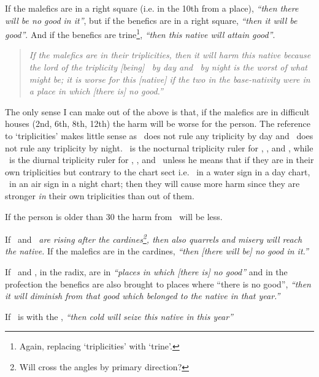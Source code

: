 If  the malefics are in a right square (i.e. in the 10th from a place), \textsl{``then there will be no good in it''}, but if the benefics are in a right square, \textsl{``then it will be good''}. And if the benefics are trine\footnote{Again, replacing `triplicities' with `trine'.}, \textsl{``then this native will attain good''}.

\begin{quote}
\textsl{If the malefics are in their triplicities, then it will harm this native because the lord of the triplicity [being] \Mars\, by day and \Saturn\, by night is the worst of what might be; it is worse for this [native] if the two in the base-nativity were in a place in which [there is] no good.''}
\end{quote}

\begin{mdframed}[backgroundcolor=cyan!5, rightmargin=1em, leftmargin=1em]
The only sense I can make out of the above is that, if the malefics are in difficult houses (2nd, 6th, 8th, 12th) the harm will be worse for the person. The reference to `triplicities' makes little sense as \Mars\, does not rule any triplicity by day and \Saturn\, does not rule any triplicity by night. \Mars\, is the nocturnal triplicity ruler for \Cancer, \Scorpio, and \Pisces, while \Saturn\, is the diurnal triplicity ruler for \Gemini, \Libra, and \Aquarius\, unless he means that if they are in their own triplicities but contrary to the chart sect i.e. \Mars\, in a water sign in a day chart, \Saturn\, in an air sign in a night chart; then they will cause more harm since they are stronger \textsl{in} their own triplicities than out of them.
\end{mdframed}

If  the person is older than 30 the harm from \Saturn\, will be less.

If  \Saturn\, and \Mars\, \textsl{are rising after the cardines\footnote{Will cross the angles by primary direction?}, then also quarrels and misery will reach the native.} If the malefics are in the cardines, \textsl{``then [there will be] no good in it.''}

If  \Saturn\, and \Mars, in the radix, are in \textsl{``places in which [there is] no good''} and in the profection the benefics are also brought to places where ``there is no good'', \textsl{``then it will diminish from that good which belonged to the native in that year.''}

If  \Saturn\, is with the \Moon, \textsl{``then cold will seize this native in this year''}

